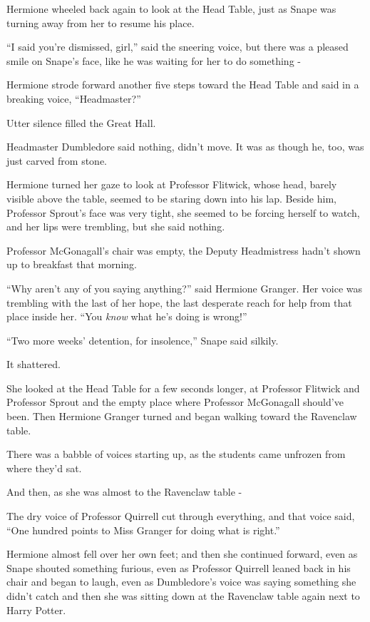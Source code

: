 Hermione wheeled back again to look at the Head Table, just as Snape was turning away from her to resume his place.

``I said you're dismissed, girl,'' said the sneering voice, but there was a pleased smile on Snape's face, like he was waiting for her to do something -

Hermione strode forward another five steps toward the Head Table and said in a breaking voice, ``Headmaster?''

Utter silence filled the Great Hall.

Headmaster Dumbledore said nothing, didn't move. It was as though he, too, was just carved from stone.

Hermione turned her gaze to look at Professor Flitwick, whose head, barely visible above the table, seemed to be staring down into his lap. Beside him, Professor Sprout's face was very tight, she seemed to be forcing herself to watch, and her lips were trembling, but she said nothing.

Professor McGonagall's chair was empty, the Deputy Headmistress hadn't shown up to breakfast that morning.

``Why aren't any of you saying anything?'' said Hermione Granger. Her voice was trembling with the last of her hope, the last desperate reach for help from that place inside her. ``You \emph{know} what he's doing is wrong!''

``Two more weeks' detention, for insolence,'' Snape said silkily.

It shattered.

She looked at the Head Table for a few seconds longer, at Professor Flitwick and Professor Sprout and the empty place where Professor McGonagall should've been. Then Hermione Granger turned and began walking toward the Ravenclaw table.

There was a babble of voices starting up, as the students came unfrozen from where they'd sat.

And then, as she was almost to the Ravenclaw table -

The dry voice of Professor Quirrell cut through everything, and that voice said, ``One hundred points to Miss Granger for doing what is right.''

Hermione almost fell over her own feet; and then she continued forward, even as Snape shouted something furious, even as Professor Quirrell leaned back in his chair and began to laugh, even as Dumbledore's voice was saying something she didn't catch and then she was sitting down at the Ravenclaw table again next to Harry Potter.

